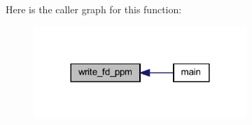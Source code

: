 Here is the caller graph for this function\+:
\nopagebreak
\begin{figure}[H]
\begin{center}
\leavevmode
\includegraphics[width=228pt]{Marco_8f90_a6c5a9a67801add3eebe2342e6b8ce010_icgraph}
\end{center}
\end{figure}
\mbox{\label{Marco_8f90_a19af5e29ee475d2389b569fea2f1a91d}} 
